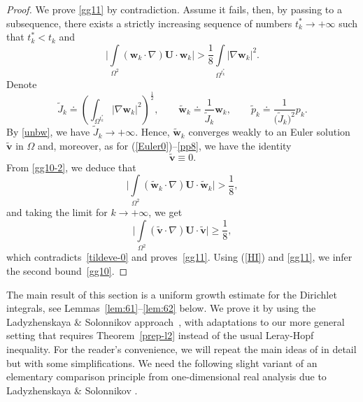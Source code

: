 \documentclass[11pt]{article}
\numberwithin{equation}{section}
\numberwithin{figure}{section}
\def\ve{{\mathbf v}}
\def\we{{\mathbf w}}
\begin{document}
\begin{proof} 
	We prove \eqref{gg11} by contradiction. Assume it fails, then, by passing to a subsequence,  there exists a strictly increasing sequence of numbers
	$t^*_k \to +\infty$  such that $t^*_k<t_k$ and 
	\begin{equation}\label{gg10-2}
		\biggl|\int\limits_{\Omega^2}(\mathbf{w}_{k} \cdot \nabla) \mathbf{U}\cdot\we_{k}\biggr|>
		\frac18\int\limits_{\Omega^{t^*_k} }|\nabla\we_{k}|^2.
	\end{equation}
Denote
	\begin{equation}
		\widetilde{J}_k \doteq \left(\int_{\Omega^{t^*_k}} |\nabla \we_k|^2\right)^\frac12,\qquad\widetilde{\we}_k\doteq\frac1{\widetilde{J}_k}\we_k, \qquad \widetilde{p}_k\doteq\frac1{ \bigl(\widetilde{J}_k\bigr)^2 }p_k.
	\end{equation}
	By \eqref{unbw}, we have $\widetilde{J}_k \to +\infty$. Hence, $\widetilde{\we}_k$ converges weakly to an Euler solution $\widetilde{\ve}$
in $\Omega$ and, moreover, as for (\ref{Euler0})--\eqref{pp8}, we have the identity
	\begin{equation} \label{tildeve-0}
		\widetilde{\ve} \equiv 0.
	\end{equation}
	From \eqref{gg10-2}, we deduce that
	\begin{equation}
		\biggl|\int\limits_{\Omega^2}(\widetilde{\mathbf{w}}_{k} \cdot \nabla) \mathbf{U}\cdot\widetilde{\we}_{k}\biggr|>
		\frac18,
	\end{equation}
	and taking the limit for $k \to +\infty$,  we get
	\begin{equation} \label{519}
		\biggl|\int\limits_{\Omega^2}(\widetilde{\ve} \cdot \nabla) \mathbf{U}\cdot\widetilde{\ve}\biggr|\ge\frac18,	\end{equation}
which contradicts~\eqref{tildeve-0} and proves~\eqref{gg11}.  Using (\ref{HI}) and \eqref{gg11}, we infer the second bound~\eqref{gg10}.	
\end{proof}


The main result of this section is a uniform growth estimate for the Dirichlet integrals, see Lemmas~\ref{lem:61}--\ref{lem:62} below.
We prove it by using the Ladyzhenskaya \& Solonnikov approach~\cite{ladyzhenskaya1983determination}, with adaptations to our more general
setting that requires Theorem~\ref{prep-l2} instead of the usual Leray-Hopf inequality. For the reader's convenience, we will repeat
the main ideas of \cite{ladyzhenskaya1983determination} in detail but with some simplifications. We need the following slight variant of an elementary comparison principle from one-dimensional real analysis due to Ladyzhenskaya \& Solonnikov \cite[Lemma 2.3]{ladyzhenskaya1983determination}.
\end{document}
